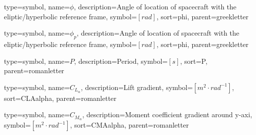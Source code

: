 {
type=symbol, %
name={\ensuremath{\phi}}, %
description={Angle of location of spacecraft with the eliptic/hyperbolic reference frame}, %
symbol={$\left[rad\right]$}, %
sort=phi, %
parent=greekletter %
}

{
type=symbol, %
name={\ensuremath{\phi_p}}, %
description={Angle of location of spacecraft with the eliptic/hyperbolic reference frame}, %
symbol={$\left[rad\right]$}, %
sort=phi, %
parent=greekletter %
}

{
	type=symbol, %
	name={\ensuremath{P}}, %
	description={Period}, %
	symbol={$\left[s\right]$}, %
	sort=P, %
	parent=romanletter %
}

{
	type=symbol, %
	name={\ensuremath{C_{L_\alpha}}}, %
	description={Lift gradient}, %
	symbol={$\left[m^2\cdot rad^{-1}\right]$}, %
	sort=CLAalpha, %
	parent=romanletter %
}

{
	type=symbol, %
	name={\ensuremath{C_{M_\alpha}}}, %
	description={Moment coefficient gradient around y-axi}, %
	symbol={$\left[m^2\cdot rad^{-1}\right]$}, %
	sort=CMAalpha, %
	parent=romanletter %
}

